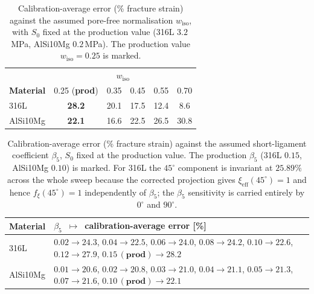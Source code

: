 \documentclass[12pt,a4paper,twocolumn]{article}
\providecommand{\ang}[1]{\ensuremath{#1^{\circ}}}
\begin{document}
\begin{table}[htbp]
\centering
\caption{Calibration-average error (\% fracture strain) against the assumed pore-free normalisation $w_{\mathrm{iso}}$, with $S_0$ fixed at the production value (316L $3.2$\,MPa, AlSi10Mg $0.2$\,MPa). The production value $w_{\mathrm{iso}} = 0.25$ is marked.}
\label{tab:si_wiso}
\footnotesize
\setlength{\tabcolsep}{4pt}
\begin{tabular}{lccccc}
\toprule
 & \multicolumn{5}{c}{$w_{\mathrm{iso}}$} \\
\textbf{Material} & 0.25 (\textbf{prod}) & 0.35 & 0.45 & 0.55 & 0.70 \\
\midrule
316L     & \textbf{28.2} & 20.1 & 17.5 & 12.4 & 8.6 \\
AlSi10Mg & \textbf{22.1} & 16.6 & 22.5 & 26.5 & 30.8 \\
\bottomrule
\end{tabular}
\end{table}

\begin{table}[htbp]
\centering
\caption{Calibration-average error (\% fracture strain) against the assumed short-ligament coefficient $\beta_5$, $S_0$ fixed at the production value. The production $\beta_5$ (316L $0.15$, AlSi10Mg $0.10$) is marked. For 316L the $\ang{45}$ component is invariant at $25.89\%$ across the whole sweep because the corrected projection gives $\xi_{\mathrm{eff}}(\ang{45}) = 1$ and hence $f_\xi(\ang{45}) = 1$ independently of $\beta_5$; the $\beta_5$ sensitivity is carried entirely by $\ang{0}$ and $\ang{90}$.}
\label{tab:si_beta5}
\footnotesize
\setlength{\tabcolsep}{4pt}
\begin{tabular}{lp{}}
\toprule
\textbf{Material} & $\beta_5$~$\mapsto$~calibration-average error [\%] \\
\midrule
316L     & $0.02\!\to\!24.3$, $0.04\!\to\!22.5$, $0.06\!\to\!24.0$, $0.08\!\to\!24.2$, $0.10\!\to\!22.6$, $0.12\!\to\!27.9$, $\mathbf{0.15\,(\textbf{prod})\!\to\!28.2}$ \\
AlSi10Mg & $0.01\!\to\!20.6$, $0.02\!\to\!20.8$, $0.03\!\to\!21.0$, $0.04\!\to\!21.1$, $0.05\!\to\!21.3$, $0.07\!\to\!21.6$, $\mathbf{0.10\,(\textbf{prod})\!\to\!22.1}$ \\
\bottomrule
\end{tabular}
\end{table}
\end{document}

